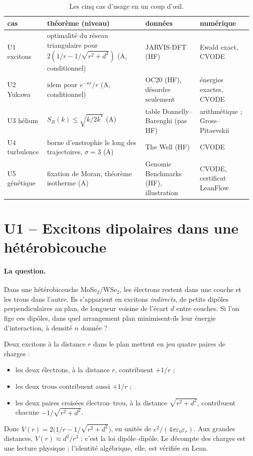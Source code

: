 \begin{table}[ht]\centering\small
\caption{Les cinq cas d'usage en un coup d'\oe il.}\label{ch5:tab:resume}
\begin{tabular}{p{2.2cm}p{3.6cm}p{3.4cm}p{4.2cm}}\toprule
cas & théorème (niveau) & données & numérique\\\midrule
U1 excitons & optimalité du réseau triangulaire pour $2(1/r-1/\sqrt{r^2+d^2})$ (A, conditionnel) &
JARVIS-DFT (HF) & Ewald exact, CVODE \\
U2 Yukawa & idem pour $e^{-\kappa r}/r$ (A, conditionnel) & OC20 (HF), désordre seulement & énergies exactes, CVODE\\
U3 hélium & $S_B(k)\le\sqrt{k/2k^*}$ (A) & table Donnelly--Barenghi (pas HF) & arithmétique ; Gross--Pitaevskii\\
U4 turbulence & borne d'enstrophie le long des trajectoires, $\sigma=3$ (A) & The Well (HF) & CVODE\\
U5 génétique & fixation de Moran, théorème isotherme (A) & Genomic Benchmarks (HF), illustration & CVODE, certificat LeanFlow\\
\bottomrule\end{tabular}
\end{table}

\section{U1 -- Excitons dipolaires dans une hétérobicouche}\label{ch5:U1}

\paragraph{La question.} Dans une hétérobicouche MoSe$_2$/WSe$_2$, les électrons restent dans une couche et les
trous dans l'autre. Ils s'apparient en excitons \emph{indirects}, de petits dipôles perpendiculaires au plan, de
longueur voisine de l'écart $d$ entre couches. Si l'on fige ces dipôles, dans quel arrangement plan minimisent-ils leur
énergie d'interaction, à densité $n$ donnée ?

\begin{physbox}[: le potentiel]
Deux excitons à la distance $r$ dans le plan mettent en jeu quatre paires de charges :
\begin{itemize}
\item les deux électrons, à la distance $r$, contribuent $+1/r$ ;
\item les deux trous contribuent aussi $+1/r$ ;
\item les deux paires croisées électron--trou, à la distance $\sqrt{r^2+d^2}$, contribuent chacune
$-1/\sqrt{r^2+d^2}$.
\end{itemize}
Donc $V(r)=2\bigl(1/r-1/\sqrt{r^2+d^2}\bigr)$, en unités de $e^2/(4\pi\varepsilon_0\varepsilon_r)$. Aux grandes
distances, $V(r)\approx d^2/r^3$ : c'est la loi dipôle--dipôle. Le décompte des charges est une lecture
physique \tierC{} ; l'identité algébrique, elle, est vérifiée en Lean.
\end{physbox}


